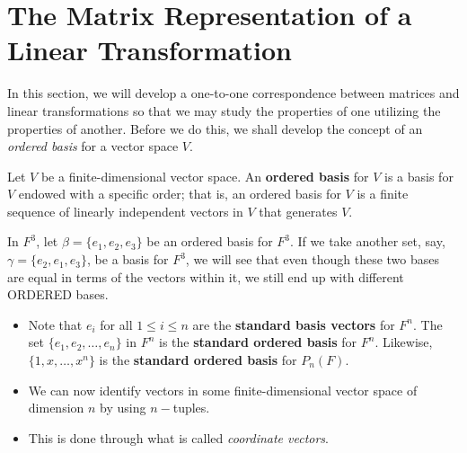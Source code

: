 \section{The Matrix Representation of a Linear Transformation}

In this section, we will develop a one-to-one correspondence between matrices and linear transformations so that we may study the properties of one utilizing the properties of another. Before we do this, we shall develop the concept of an \textit{ordered basis} for a vector space \( V  \).

\begin{definition}
    Let \( V  \) be a finite-dimensional vector space. An \textbf{ordered basis} for \( V  \) is a basis for \( V  \) endowed with a specific order; that is, an ordered basis for \( V  \) is a finite sequence of linearly independent vectors in \( V  \) that generates \( V  \).
\end{definition}

\begin{eg}
    In \( F^{3} \), let \( \beta = \{ e_{1}, e_{2}, e_{3} \}  \) be an ordered basis for \( F^{3} \). If we take another set, say, \( \gamma = \{ e_{2}, e_{1}, e_{3} \}  \), be a basis for \( F^{3} \), we will see that even though these two bases are equal in terms of the vectors within it, we still end up with different ORDERED bases.
\end{eg}

\begin{itemize}
   \item Note that \( e_{i}  \) for all \( 1 \leq  i \leq n  \) are the \textbf{standard basis vectors} for \( F^{n} \). The set \( \{  e_{1}, e_{2}, \dots, e_{n} \}  \) in \( F^{n} \) is the \textbf{standard ordered basis} for \( F^{n} \). Likewise, \( \{ 1,x,\dots, x^{n} \}  \) is the \textbf{standard ordered basis} for \( P_{n}(F) \).
    \item We can now identify vectors in some finite-dimensional vector space of dimension \( n  \) by using \( n- \)tuples.
    \item This is done through what is called \textit{coordinate vectors}.
\end{itemize}

